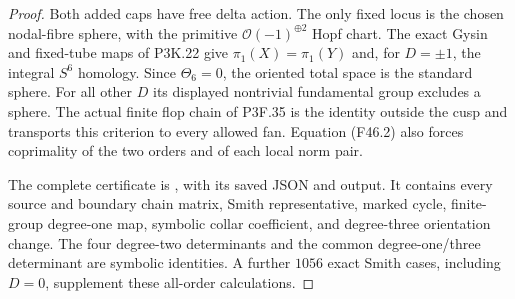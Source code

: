 \begin{proof}
Both added caps have free delta action. The only fixed locus
is the chosen nodal-fibre sphere, with the primitive
$\mathcal O(-1)^{\oplus2}$ Hopf chart. The exact Gysin and
fixed-tube maps of P3K.22 give $\pi_1(X)=\pi_1(Y)$ and, for
$D=\pm1$, the integral $S^6$ homology. Since $\Theta_6=0$,
the oriented total space is the standard sphere. For all other
$D$ its displayed nontrivial fundamental group excludes a
sphere. The actual finite flop chain of P3F.35 is the identity
outside the cusp and transports this criterion to every allowed
fan. Equation (F46.2) also forces coprimality of the two orders
and of each local norm pair.

The complete certificate is
, with its saved JSON and
output. It contains every source and boundary chain matrix,
Smith representative, marked cycle, finite-group degree-one
map, symbolic collar coefficient, and degree-three orientation
change. The four degree-two determinants and the common
degree-one/three determinant are symbolic identities. A further
$1056$ exact Smith cases, including $D=0$, supplement these
all-order calculations.
\end{proof}
